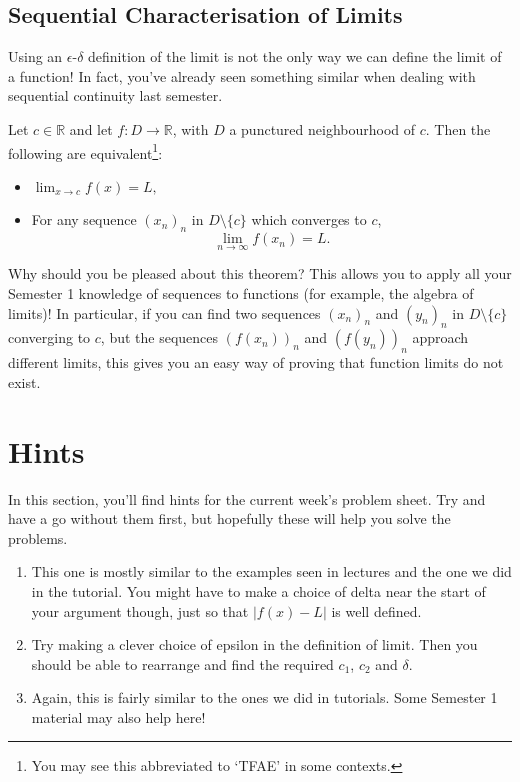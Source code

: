 \documentclass[
  17pt,
  a4paper]{extarticle}
\providecommand{\tightlist}{%
  \setlength{\itemsep}{0pt}\setlength{\parskip}{0pt}}
\theoremstyle{plain}
\theoremstyle{definition}
\theoremstyle{plain}
\theoremstyle{plain}
\theoremstyle{plain}
\theoremstyle{plain}
\theoremstyle{definition}
\theoremstyle{definition}
\theoremstyle{remark}
\theoremstyle{remark}
\let\BeginKnitrBlock\begin \let\EndKnitrBlock\end
\renewcommand{\;}{\,}
\begin{document}
\hypertarget{sequential-characterisation-of-limits}{%
\subsection{Sequential Characterisation of Limits}\label{sequential-characterisation-of-limits}}

Using an \(\epsilon\)-\(\delta\) definition of the limit is not the only way we can define the limit of a function! In fact, you've already seen something similar when dealing with sequential continuity last semester.

\BeginKnitrBlock{theorem}[Sequential Characterisation of Limit]
{\label{thm:thm1} }Let \(c\in\mathbb{R}\) and let \(f: D \to \mathbb{R}\), with \(D\) a punctured neighbourhood of \(c\). Then the following are equivalent\footnote{You may see this abbreviated to `TFAE' in some contexts.}:

\begin{itemize}
\item
  \(\lim_{x\to c}f(x) = L,\)
\item
  For any sequence \((x_n)_n\) in \(D\setminus\lbrace c \rbrace\) which converges to \(c\), \[\lim_{n\to\infty}f(x_n) =L.\]
\end{itemize}
\EndKnitrBlock{theorem}

Why should you be pleased about this theorem? This allows you to apply all your Semester 1 knowledge of sequences to functions (for example, the algebra of limits)! In particular, if you can find two sequences \((x_n)_n\) and \((y_n)_n\) in \(D\setminus\lbrace c\rbrace\) converging to \(c\), but the sequences \(\left(f(x_n)\right)_n\) and \(\left(f(y_n)\right)_n\) approach different limits, this gives you an easy way of proving that function limits do not exist.

\hypertarget{hints}{%
\section{Hints}\label{hints}}

In this section, you'll find hints for the current week's problem sheet. Try and have a go without them first, but hopefully these will help you solve the problems.

\begin{enumerate}
\def\labelenumi{\arabic{enumi})}
\tightlist
\item
  This one is mostly similar to the examples seen in lectures and the one we did in the tutorial. You might have to make a choice of delta near the start of your argument though, just so that \(\lvert f(x) - L \rvert\) is well defined.
\item
  Try making a clever choice of epsilon in the definition of limit. Then you should be able to rearrange and find the required \(c_1\), \(c_2\) and \(\delta\).
\item
  Again, this is fairly similar to the ones we did in tutorials. Some Semester 1 material may also help here!
\end{enumerate}
\end{document}
